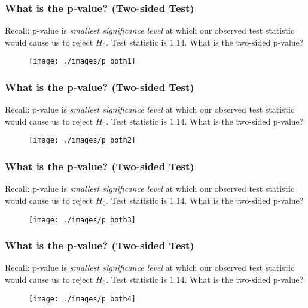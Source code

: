 \documentclass{beamer}
\begin{document}
\begin{frame}
\frametitle{What is the p-value? (Two-sided Test)}
\footnotesize
Recall: p-value is \emph{smallest significance level} at which our observed test statistic would cause us to reject $H_0$. \alert{Test statistic is $1.14$. What is the two-sided p-value? }
\begin{figure}
\texttt{[image: ./images/p\_both1]}

\end{figure}

\end{frame}

\begin{frame}
\frametitle{What is the p-value? (Two-sided Test)}
\footnotesize
Recall: p-value is \emph{smallest significance level} at which our observed test statistic would cause us to reject $H_0$. \alert{Test statistic is $1.14$. What is the two-sided p-value? }
\begin{figure}
\texttt{[image: ./images/p\_both2]}

\end{figure}

\end{frame}

\begin{frame}
\frametitle{What is the p-value? (Two-sided Test)}
\footnotesize
Recall: p-value is \emph{smallest significance level} at which our observed test statistic would cause us to reject $H_0$. \alert{Test statistic is $1.14$. What is the two-sided p-value? }
\begin{figure}
\texttt{[image: ./images/p\_both3]}

\end{figure}

\end{frame}

\begin{frame}
\frametitle{What is the p-value? (Two-sided Test)}
\footnotesize
Recall: p-value is \emph{smallest significance level} at which our observed test statistic would cause us to reject $H_0$. \alert{Test statistic is $1.14$. What is the two-sided p-value? }
\begin{figure}
\texttt{[image: ./images/p\_both4]}

\end{figure}

\end{frame}
\end{document}
